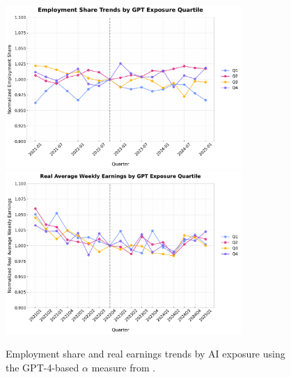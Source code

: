 \documentclass[12pt]{article}
\numberwithin{equation}{section}
\theoremstyle{theorem}\newcustomtheorem{theorem}{{\bf\sc Theorem}}
\theoremstyle{definition}\newcustomtheorem{assumption}{{\bf\sc Assumption}}
\theoremstyle{theorem} \newcustomtheorem{proposition}{{\bf\sc Proposition}}
\begin{document}
\appendix

\setcounter{figure}{0}
\renewcommand{\thefigure}{A\arabic{figure}}
\setcounter{table}{0}
\renewcommand{\thetable}{A\arabic{table}}

\section*{\\[0.6cm]
}

\begin{figure}[htbp]
	\centering
  \includegraphics[width=0.8\textwidth]{../figures/employment_share_by_gpt4_alpha_quartile_2021Q1.pdf}
  \includegraphics[width=0.8\textwidth]{../figures/real_earnings_by_gpt4_alpha_quartile_2021Q1.pdf}
	\caption{Employment share and real earnings trends by AI exposure using the GPT-4-based $\alpha$ measure from \citet{eloundou_gpts_2023}.}
	\label{fig:employment_trends_alpha}
\end{figure}
\end{document}
